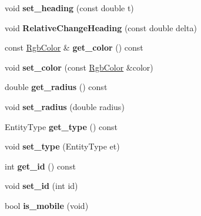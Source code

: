 \begin{DoxyCompactItemize}
\item 
void {\bfseries set\+\_\+heading} (const double t)\hypertarget{classSensor_a95e911a62cef5adfbb0a8ee395cfa881}{}\label{classSensor_a95e911a62cef5adfbb0a8ee395cfa881}

\item 
void {\bfseries Relative\+Change\+Heading} (const double delta)\hypertarget{classSensor_ad93b67ee775232e4b6e939fd043f0b84}{}\label{classSensor_ad93b67ee775232e4b6e939fd043f0b84}

\item 
const \hyperlink{structRgbColor}{Rgb\+Color} \& {\bfseries get\+\_\+color} () const \hypertarget{classSensor_af5c275ceac411cfcc0903d6d837ed3e7}{}\label{classSensor_af5c275ceac411cfcc0903d6d837ed3e7}

\item 
void {\bfseries set\+\_\+color} (const \hyperlink{structRgbColor}{Rgb\+Color} \&color)\hypertarget{classSensor_a4c7c83edd18efc4a93d3fda798dbceec}{}\label{classSensor_a4c7c83edd18efc4a93d3fda798dbceec}

\item 
double {\bfseries get\+\_\+radius} () const \hypertarget{classSensor_ac162788b261665579ba610532bf4a4cc}{}\label{classSensor_ac162788b261665579ba610532bf4a4cc}

\item 
void {\bfseries set\+\_\+radius} (double radius)\hypertarget{classSensor_a74578f3ec9a9c6e210789b207af2089e}{}\label{classSensor_a74578f3ec9a9c6e210789b207af2089e}

\item 
Entity\+Type {\bfseries get\+\_\+type} () const \hypertarget{classSensor_aeff6585edbe2f303da79a02c7c5a0d41}{}\label{classSensor_aeff6585edbe2f303da79a02c7c5a0d41}

\item 
void {\bfseries set\+\_\+type} (Entity\+Type et)\hypertarget{classSensor_ace463933d894e91350f7598b2f42def1}{}\label{classSensor_ace463933d894e91350f7598b2f42def1}

\item 
int {\bfseries get\+\_\+id} () const \hypertarget{classSensor_a014c445e574b86f3684dab5e6194977d}{}\label{classSensor_a014c445e574b86f3684dab5e6194977d}

\item 
void {\bfseries set\+\_\+id} (int id)\hypertarget{classSensor_a62d902d9bf052d3a1d8d0e98d5da70d0}{}\label{classSensor_a62d902d9bf052d3a1d8d0e98d5da70d0}

\item 
bool {\bfseries is\+\_\+mobile} (void)\hypertarget{classSensor_a819aa6bf72c824c0e3b0e2a85c05431c}{}\label{classSensor_a819aa6bf72c824c0e3b0e2a85c05431c}


\end{DoxyCompactItemize}
